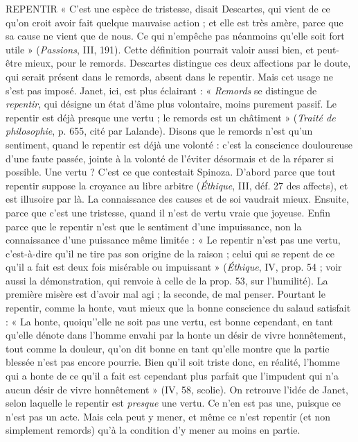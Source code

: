 REPENTIR  « C’est une espèce de tristesse, disait Descartes, qui vient de ce
qu’on croit avoir fait quelque mauvaise action ; et elle est très
amère, parce que sa cause ne vient que de nous. Ce qui n'empêche pas néanmoins
qu’elle soit fort utile » ({\it Passions}, III, 191). Cette définition pourrait
valoir aussi bien, et peut-être mieux, pour le remords. Descartes distingue ces
deux affections par le doute, qui serait présent dans le remords, absent dans
le repentir. Mais cet usage ne s’est pas imposé. Janet, ici, est plus éclairant :
« {\it Remords} se distingue de {\it repentir}, qui désigne un état d’âme plus volontaire,
moins purement passif. Le repentir est déjà presque une vertu ; le remords
est un châtiment » ({\it Traité de philosophie}, p. 655, cité par Lalande). Disons
que le remords n’est qu’un sentiment, quand le repentir est déjà une volonté :
c’est la conscience douloureuse d’une faute passée, jointe à la volonté de
l’éviter désormais et de la réparer si possible. Une vertu ? C’est ce que contestait
Spinoza. D'abord parce que tout repentir suppose la croyance au libre
arbitre ({\it Éthique}, III, déf. 27 des affects), et est illusoire par là. La connaissance
des causes et de soi vaudrait mieux. Ensuite, parce que c’est une tristesse,
quand il n’est de vertu vraie que joyeuse. Enfin parce que le repentir
n’est que le sentiment d’une impuissance, non la connaissance d’une puissance
même limitée : « Le repentir n’est pas une vertu, c’est-à-dire qu'il ne
tire pas son origine de la raison ; celui qui se repent de ce qu’il a fait est deux
fois misérable ou impuissant » ({\it Éthique}, IV, prop. 54 ; voir aussi la démonstration,
qui renvoie à celle de la prop. 53, sur l'humilité). La première misère
est d’avoir mal agi ; la seconde, de mal penser. Pourtant le repentir, comme
la honte, vaut mieux que la bonne conscience du salaud satisfait : « La honte,
quoiqu'’elle ne soit pas une vertu, est bonne cependant, en tant qu’elle dénote
dans l’homme envahi par la honte un désir de vivre honnêtement, tout
comme la douleur, qu’on dit bonne en tant qu’elle montre que la partie
blessée n’est pas encore pourrie. Bien qu’il soit triste donc, en réalité,
l’homme qui a honte de ce qu’il a fait est cependant plus parfait que l'impudent
qui n’a aucun désir de vivre honnêtement » (IV, 58, scolie). On retrouve
l'idée de Janet, selon laquelle le repentir est {\it presque} une vertu. Ce n’en est pas
une, puisque ce n’est pas un acte. Mais cela peut y mener, et même ce n'est
repentir (et non simplement remords) qu’à la condition d’y mener au moins
en partie.


